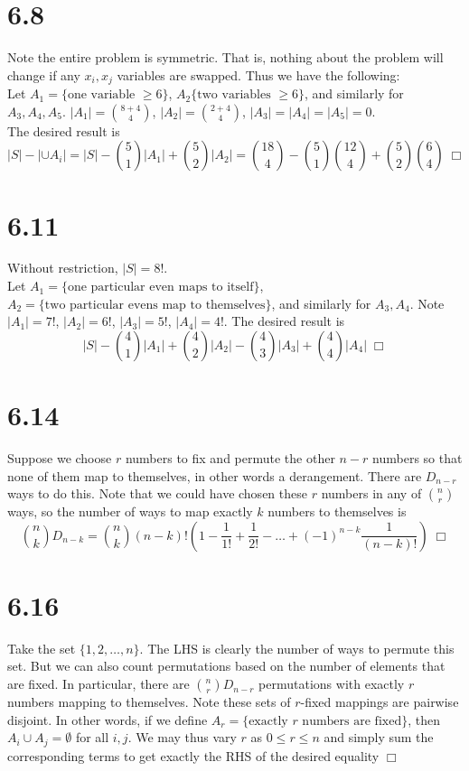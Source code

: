 \documentclass{article}
\begin{document}
\section*{6.8}
Note the entire problem is symmetric. That is, nothing about the problem will change if any $x_i, x_j$ variables are swapped. Thus we have the following:\\
Let $A_1 = \{\text{one variable } \geq 6\}$, $A_2 \{\text{two variables } \geq 6\}$, and similarly for $A_3, A_4, A_5$. $|A_1| = \binom{8+4}{4}$, $|A_2| = \binom{2+4}{4}$, $|A_3| = |A_4| = |A_5| = 0$.\\
The desired result is
$$|S| - |\cup A_i| = |S| - \binom{5}{1}|A_1| + \binom{5}{2}|A_2| = \binom{18}{4} - \binom{5}{1}\binom{12}{4} + \binom{5}{2}\binom{6}{4} \;\Box$$

\section*{6.11}
Without restriction, $|S| = 8!$.\\
Let $A_1 = \{\text{one particular even maps to itself}\}$, $A_2 = \{\text{two particular evens map to themselves}\}$, and similarly for $A_3, A_4$. Note $|A_1| = 7!$, $|A_2| = 6!$, $|A_3| = 5!$, $|A_4| = 4!$. The desired result is
$$|S| - \binom{4}{1}|A_1| + \binom{4}{2}|A_2| - \binom{4}{3}|A_3| + \binom{4}{4}|A_4| \; \Box$$

\section*{6.14}
Suppose we choose $r$ numbers to fix and permute the other $n - r$ numbers so that none of them map to themselves, in other words a derangement. There are $D_{n-r}$ ways to do this. Note that we could have chosen these $r$ numbers in any of $\binom{n}{r}$ ways, so the number of ways to map exactly $k$ numbers to themselves is
$$\binom{n}{k}D_{n-k} = \binom{n}{k}(n-k)! \left( 1 - \frac{1}{1!} + \frac{1}{2!} - \dots + (-1)^{n-k} \frac{1}{(n-k)!} \right) \; \Box$$

\section*{6.16}
Take the set $\{1,2,\dots , n\}$. The LHS is clearly the number of ways to permute this set. But we can also count permutations based on the number of elements that are fixed. In particular, there are $\binom{n}{r}D_{n-r}$ permutations with exactly $r$ numbers mapping to themselves. Note these sets of $r$-fixed mappings are pairwise disjoint. In other words, if we define $A_r = \{\text{exactly } r \text{ numbers are fixed}\}$, then $A_i \cup A_j = \emptyset$ for all $i,j$. We may thus vary $r$ as $0 \leq r \leq n$ and simply sum the corresponding terms to get exactly the RHS of the desired equality $\Box$
\end{document}
